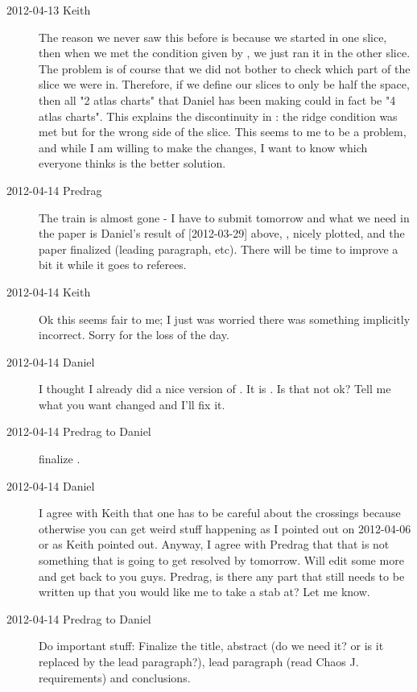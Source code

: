 \begin{description}
\item[2012-04-13 Keith]
The reason we never saw this before is because we started in one slice,
then when we met the condition given by , we just ran
it in the other slice. The problem is of course that we did not bother to
check which part of the slice we were in.  Therefore, if we define our
slices to only be half the space, then all "2 atlas charts" that Daniel
has been making could in fact be "4 atlas charts".  This explains the
discontinuity in : the ridge condition was met but for
the wrong side of the slice.  This seems to me to be a problem, and while
I am willing to make the changes, I want to know which everyone thinks is
the better solution.

\item[2012-04-14 Predrag] The train is almost gone - I have to submit
tomorrow and what we need in the paper is Daniel's result of [2012-03-29]
above, , nicely plotted, and the paper finalized
(leading paragraph, etc). There will be time to improve a bit it while it
goes to referees.

\item[2012-04-14 Keith] Ok this seems fair to me; I just was worried
there was something implicitly incorrect.  Sorry for the loss of the day.

\item[2012-04-14 Daniel] I thought I already did a nice version of
. It is . Is that not ok?
Tell me what you want changed and I'll fix it.

\item[2012-04-14 Predrag to Daniel] finalize .

\item[2012-04-14 Daniel]
I agree with Keith that one has to be careful about the crossings because
otherwise you can get weird stuff happening as I pointed out on
2012-04-06 or as Keith pointed out. Anyway, I agree with Predrag that
that is not something that is going to get resolved by tomorrow. Will
edit some more and get back to you guys. Predrag, is there any part that
still needs to be written up that you would like me to take a stab at?
Let me know.

\item[2012-04-14 Predrag to Daniel] Do important stuff: Finalize the
title, abstract (do we need it? or is it replaced by the lead
paragraph?), lead paragraph (read Chaos J. requirements) and conclusions.


\end{description}

